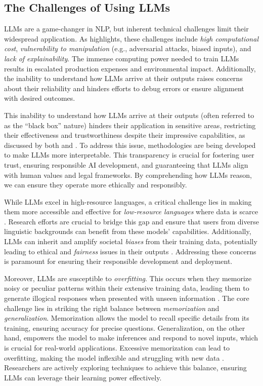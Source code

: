 {{\subsection{The Challenges of Using LLMs}

LLMs are a game-changer in NLP, but inherent technical challenges limit their widespread application. As \textcite[30]{naveed2024comprehensive} highlights, these challenges include \emph{high computational cost}, \emph{vulnerability to manipulation} (e.g., adversarial attacks, biased inputs), and \emph{lack of explainability}. The immense computing power needed to train LLMs results in escalated production expenses and environmental impact. Additionally, the inability to understand how LLMs arrive at their outputs raises concerns about their reliability and hinders efforts to debug errors or ensure alignment with desired outcomes.

This inability to understand how LLMs arrive at their outputs (often referred to as the ``black box'' nature) hinders their application in sensitive areas, restricting their effectiveness and trustworthiness despite their impressive capabilities, as discussed by both \textcite{naveed2024comprehensive} and \textcite{yuhan-etal-2023-unleashing}. To address this issue, methodologies are being developed to make LLMs more interpretable. This transparency is crucial for fostering user trust, ensuring responsible AI development, and guaranteeing that LLMs align with human values and legal frameworks. By comprehending how LLMs reason, we can ensure they operate more ethically and responsibly.

While LLMs excel in high-resource languages, a critical challenge lies in making them more accessible and effective for \emph{low-resource languages} where data is scarce \parencite{chung2022scaling}. Research efforts are crucial to bridge this gap and ensure that users from diverse linguistic backgrounds can benefit from these models' capabilities. Additionally, LLMs can inherit and amplify societal \emph{biases} from their training data, potentially leading to ethical and \emph{fairness} issues in their outputs \parencite{naveed2024comprehensive}. Addressing these concerns is paramount for ensuring their responsible development and deployment.

Moreover, LLMs are susceptible to \emph{overfitting}. This occurs when they memorize noisy or peculiar patterns within their extensive training data, leading them to generate illogical responses when presented with unseen information \parencite{naveed2024comprehensive}. The core challenge lies in striking the right balance between \textit{memorization} and \textit{generalization}. Memorization allows the model to recall specific details from its training, ensuring accuracy for precise questions. Generalization, on the other hand, empowers the model to make inferences and respond to novel inputs, which is crucial for real-world applications. Excessive memorization can lead to overfitting, making the model inflexible and struggling with new data \parencite{naveed2024comprehensive}. Researchers are actively exploring techniques to achieve this balance, ensuring LLMs can leverage their learning power effectively.

}}
